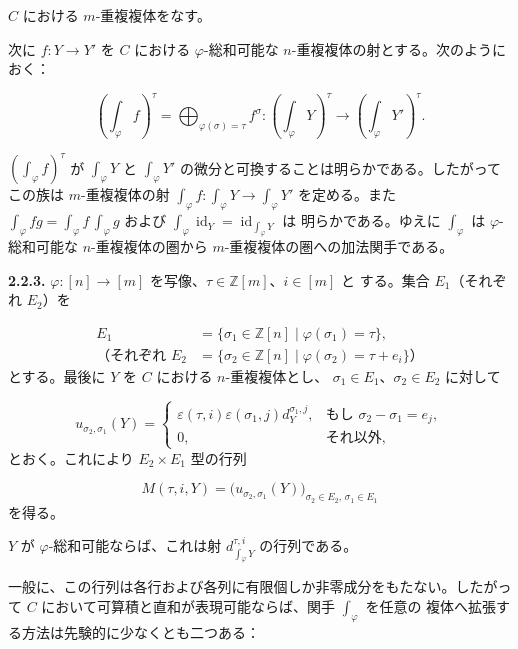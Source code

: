\clearpage
{}%
%
$C$ における $m$-重複複体をなす。

次に $f\colon Y\to Y'$ を $C$ における $\varphi$-総和可能な
$n$-重複複体の射とする。次のようにおく：

\begin{equation}
  \left(\int_\varphi f\right)^\tau
  =\bigoplus_{\varphi(\sigma)=\tau}f^\sigma\colon
  \left(\int_\varphi Y\right)^\tau
  \longrightarrow
  \left(\int_\varphi Y'\right)^\tau.
  \tag{2.2.2.6}
\end{equation}

$\left(\int_\varphi f\right)^\tau$ が $\int_\varphi Y$ と
$\int_\varphi Y'$ の微分と可換することは明らかである。したがってこの族は
$m$-重複複体の射
$\int_\varphi f\colon\int_\varphi Y\to\int_\varphi Y'$ を定める。また
$\int_\varphi fg=\int_\varphi f\,\int_\varphi g$ および
$\int_\varphi\operatorname{id}_Y=\operatorname{id}_{\int_\varphi Y}$ は
明らかである。ゆえに $\int_\varphi$ は $\varphi$-総和可能な
$n$-重複複体の圏から $m$-重複複体の圏への加法関手である。

\noindent\textbf{2.2.3.}\quad
$\varphi\colon[n]\to[m]$ を写像、$\tau\in\mathbb Z[m]$、$i\in[m]$ と
する。集合 $E_1$（それぞれ $E_2$）を

\[
  \begin{aligned}
    E_1&=\{\sigma_1\in\mathbb Z[n]\mid\varphi(\sigma_1)=\tau\},\\
    \text{（それぞれ }E_2
      &=\{\sigma_2\in\mathbb Z[n]\mid
          \varphi(\sigma_2)=\tau+e_i\}\text{）}
  \end{aligned}
\]
とする。最後に $Y$ を $C$ における $n$-重複複体とし、
$\sigma_1\in E_1$、$\sigma_2\in E_2$ に対して

\begin{equation}
  u_{\sigma_2,\sigma_1}(Y)
  =\begin{cases}
    \varepsilon(\tau,i)\varepsilon(\sigma_1,j)d_Y^{\sigma_1,j},
      &\text{もし }\sigma_2-\sigma_1=e_j,\\
    0,&\text{それ以外},
  \end{cases}
  \tag{2.2.3.1}
\end{equation}
とおく。これにより $E_2\times E_1$ 型の行列

\begin{equation}
  M(\tau,i,Y)
  =\bigl(u_{\sigma_2,\sigma_1}(Y)\bigr)_{
    \sigma_2\in E_2,\,\sigma_1\in E_1}
  \tag{2.2.3.2}
\end{equation}
を得る。

$Y$ が $\varphi$-総和可能ならば、これは射
$d_{\int_\varphi Y}^{\tau,i}$ の行列である。

一般に、この行列は各行および各列に有限個しか非零成分をもたない。したがって
$C$ において可算積と直和が表現可能ならば、関手 $\int_\varphi$ を任意の
複体へ拡張する方法は先験的に少なくとも二つある：

